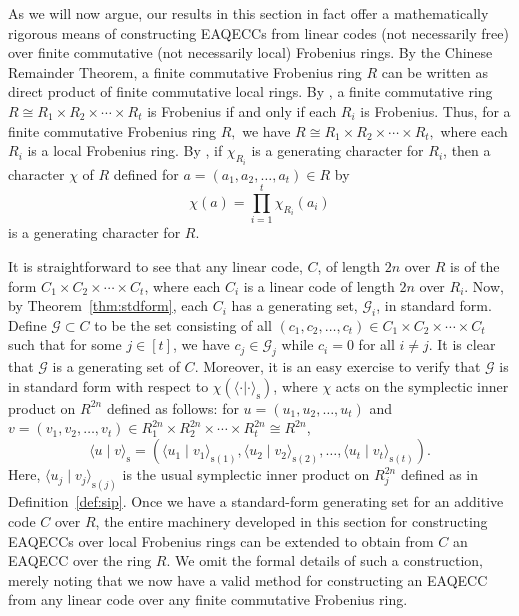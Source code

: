\documentclass{article}
\theoremstyle{remark}
\theoremstyle{definition}
\numberwithin{equation}{section}
\begin{document}
As we will now argue, our results in this section in fact offer a mathematically rigorous means of constructing EAQECCs from linear codes (not necessarily free) over finite commutative (not necessarily local) Frobenius rings.
By the Chinese Remainder Theorem, a finite commutative Frobenius ring $R$ can be written as direct product of finite commutative local rings. By \cite[Remark 1.3]{wood}, a finite commutative ring $R \cong R_1\times R_2 \times \cdots \times R_t$ is Frobenius if and only if each $R_i$ is Frobenius.
Thus, for a finite commutative Frobenius ring $R,$ we have $R \cong R_1\times R_2 \times \cdots \times R_t,$ where each $R_i$ is a local Frobenius ring.
 By \cite[Theorem 3.1]{dougherty19},  if $\chi_{R_i}$ is a generating character for $R_i$, then a character $\chi$ of $R$ defined for  $a=(a_1,a_2,\ldots,a_t) \in R$ by $$\chi(a)=\prod_{i=1}^{t}\chi_{R_i}(a_i) $$ is a generating character for $R$. 
 
It is straightforward to see that any linear code, $C$, of length $2n$ over $R$ is of the form $C_1\times C_2 \times \cdots \times C_t$, where each $C_i$ is a linear code of length $2n$ over $R_i$. Now, by Theorem~\ref{thm:stdform}, each $C_i$ has a generating set, $\mathcal{G}_i$, in standard form. 
 Define $\mathcal{G} \subset C$ to be the set consisting of all $(c_1,c_2,\ldots,c_t) \in C_1\times C_2 \times \cdots \times C_t$ such that for some $j \in [t]$, we have $c_j \in \mathcal{G}_j$ while $c_i = 0$ for all $i \ne j$.
 It is clear that $\mathcal{G}$ is a generating set of $C$. Moreover, it is an easy exercise to verify that $\mathcal{G}$ is in standard form with respect to $\chi({\langle \cdot | \cdot \rangle}_{\mathrm{s}})$, where $\chi$ acts on the symplectic inner product on $R^{2n}$ defined as follows: for $u = (u_1,u_2,\ldots,u_t)$ and $v = (v_1,v_2,\ldots,v_t) \in R_1^{2n} \times R_2^{2n} \times \cdots \times R_t^{2n} \cong R^{2n}$, 
 $$
{\langle u \mid v \rangle}_{\mathrm{s}} = \left({\langle u_1 \mid v_1 \rangle}_{\mathrm{s}(1)},{\langle u_2 \mid v_2 \rangle}_{\mathrm{s}(2)},\ldots,{\langle u_t \mid v_t \rangle}_{\mathrm{s}(t)}\right).
 $$
 Here, ${\langle u_j \mid v_j \rangle}_{\mathrm{s}(j)}$ is the usual symplectic inner product on $R_j^{2n}$ defined as in Definition~\ref{def:sip}. Once we have a standard-form generating set for an additive code $C$ over $R$, the entire machinery developed in this section for constructing EAQECCs over local Frobenius rings can be extended to obtain from $C$ an EAQECC over the ring $R$. We omit the formal details of such a construction, merely noting that we now have a valid method for constructing an EAQECC from any linear code over any finite commutative Frobenius ring. 
 
\end{document}
